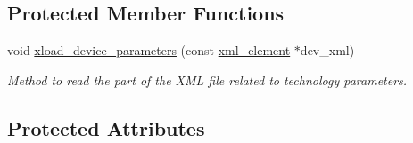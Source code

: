 \subsection*{Protected Member Functions}
\begin{DoxyCompactItemize}
\item 
void \hyperlink{classtarget__device_ad6cfdaa73e795c5c7901c482ead7d5e7}{xload\+\_\+device\+\_\+parameters} (const \hyperlink{classxml__element}{xml\+\_\+element} $\ast$dev\+\_\+xml)
\begin{DoxyCompactList}\small\item\em Method to read the part of the X\+ML file related to technology parameters. \end{DoxyCompactList}\end{DoxyCompactItemize}
\subsection*{Protected Attributes}
